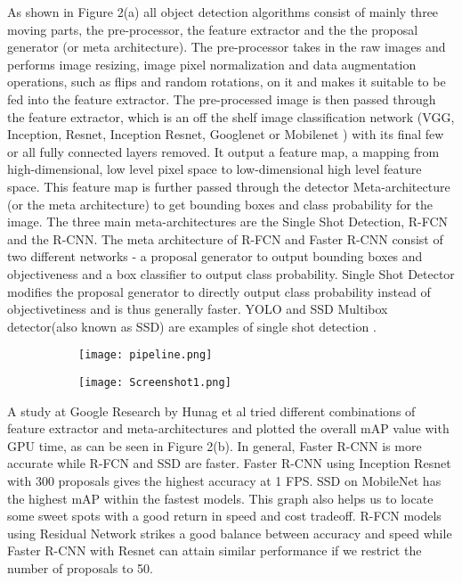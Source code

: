 \documentclass{article}
\begin{document}
As shown in Figure 2(a) all object detection algorithms consist of mainly three moving parts, the pre-processor, the feature extractor and the the proposal generator (or meta architecture).  The pre-processor takes in the raw images and performs image resizing, image pixel normalization and data augmentation operations, such as flips and random rotations, on it and makes it suitable to be fed into the feature extractor. The pre-processed image is then passed through the feature extractor, which is an off the shelf image classification network (VGG, Inception, Resnet, Inception Resnet, Googlenet or Mobilenet ) with its final few or all fully connected layers removed. It output a feature map, a mapping from high-dimensional, low level pixel space to low-dimensional high level feature space. This feature map is further passed through the detector Meta-architecture (or the meta architecture) to get bounding boxes and class probability for the image. The three main meta-architectures are the Single Shot Detection, R-FCN and the R-CNN. The meta architecture of R-FCN and Faster R-CNN consist of two different networks - a proposal generator to output bounding boxes and objectiveness and a box classifier to output class probability. Single Shot Detector modifies the proposal generator to directly output class probability instead of objectivetiness and is thus generally faster. YOLO and SSD Multibox detector(also known as SSD) are examples of single shot detection \cite{redmon2016you,liu2016ssd}. 

\begin{figure}[H]
	\centering
	\begin{subfigure}[b]{0.65\textwidth}
		\centering
		\texttt{[image: pipeline.png]}
	\end{subfigure}
	\begin{subfigure}[b]{0.325\textwidth}
		\centering
		\texttt{[image: Screenshot1.png]}
	\end{subfigure}
	\caption{}
\end{figure}

 A study at Google Research by Hunag et al\cite{huang2017speed} tried different combinations of feature extractor and meta-architectures and plotted the overall mAP value with GPU time, as can be seen in Figure 2(b). In general, Faster R-CNN is more accurate while R-FCN and SSD are faster. Faster R-CNN using Inception Resnet with 300 proposals gives the highest accuracy at 1 FPS. SSD on MobileNet has the highest mAP within the fastest models. This graph also helps us to locate some sweet spots with a good return in speed and cost tradeoff. R-FCN models using Residual Network strikes a good balance between accuracy and speed while Faster R-CNN with Resnet can attain similar performance if we restrict the number of proposals to 50.
\end{document}

